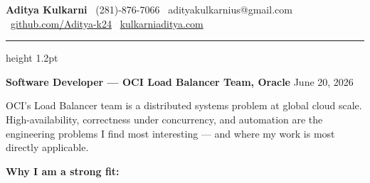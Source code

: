 \documentclass[11pt,letterpaper]{article}
\begin{document}
\thispagestyle{empty}

{\large \textbf{Aditya Kulkarni}} \hfill
{\color{OracleRed} \faPhone\ (281)-876-7066} \quad
{\color{OracleRed} \faEnvelope\ adityakulkarnius@gmail.com} \\
{\color{OracleRed} \faGithub\ \href{https://github.com/Aditya-k24}{github.com/Aditya-k24}} \quad
{\color{OracleRed} \faGlobe\ \href{https://www.kulkarniaditya.com}{kulkarniaditya.com}}

\vspace{6pt}
{\color{OracleRed}\hrule height 1.2pt}
\vspace{12pt}

{\color{OracleRed} \textbf{Software Developer --- OCI Load Balancer Team, Oracle}} \hfill June 20, 2026

\vspace{10pt}

OCI's Load Balancer team is a distributed systems problem at global cloud scale. High-availability, correctness under concurrency, and automation are the engineering problems I find most interesting --- and where my work is most directly applicable.

\vspace{6pt}

\textbf{Why I am a strong fit:}
\end{document}
